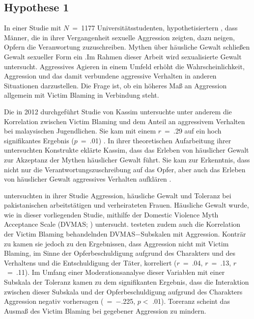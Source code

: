 \subsection{Hypothese 1}  \label{subsec_2.2.1}
In einer Studie mit $N$~=~1177 Universitätsstudenten, hypothetisiertern \textcite{H1_1993}, dass Männer, die in ihrer Vergangenheit sexuelle Aggression zeigten, dazu neigen, Opfern die Veranwortung zuzuschreiben. Mythen über häusliche Gewalt schließen Gewalt sexueller Form ein \parencite{H1_Poli_2022}.Im Rahmen dieser Arbeit wird sexualisierte Gewalt untersucht. Aggressives Agieren in einem Umfeld erhöht die Wahrscheinlichkeit, Aggression und das damit verbundene aggressive Verhalten in anderen Situationen darzustellen. Die Frage ist, ob ein höheres Maß an Aggression allgemein mit Victim Blaming in Verbindung steht.

Die in 2012 durchgeführt Studie von Kassim untersuchte unter anderem die Korrelation zwischen Victim Blaming und dem Anteil an aggressivem Verhalten bei malaysischen Jugendlichen. Sie kam mit einem $r$~=~.29 auf ein hoch signifikantes Ergebnis ($p$~=~.01) \parencite{H1_malasia_2012}. In ihrer theoretischen Aufarbeitung ihrer untersuchten Konstrukte eklärte Kassim, dass das Erleben von häuslicher Gewalt zur Akzeptanz der Mythen häuslicher Gewalt führt. Sie kam zur Erkenntnis, dass nicht nur die Verantwortungszuschreibung auf das Opfer, aber auch das Erleben von häuslicher Gewalt aggressives Verhalten aufklären \parencite{H1_malasia_2012}.

\textcite{H1_moderation_2020} untersuchten in ihrer Studie Aggression, häusliche Gewalt und Toleranz bei pakistanischen arbeitstätigen und verheirateten Frauen. Häusliche Gewalt wurde, wie in dieser vorliegenden Studie, mithilfe der Domestic Violence Myth Acceptance Scale (DVMAS; \textcite{Peters2003}) untersucht. \textcite{H1_moderation_2020} testeten zudem auch die Korrelation der Victim Blaming behandelnden DVMAS$-$Subskalen mit Aggression. Konträr zu \textcite{H1_malasia_2012} kamen sie jedoch zu den Ergebnissen, dass Aggression nicht mit Victim Blaming, im Sinne der Opferbeschuldigung aufgrund des Charakters und des Verhaltens und die Entschuldigung der Täter, korreliert ($r$~=~.04, $r$~=~.13, $r$~=~.11). Im Umfang einer Moderationsanalyse dieser Variablen mit einer Subskala der Toleranz kamen \textcite{H1_moderation_2020} zu dem signifikanten Ergebnis, dass die Interaktion zwischen dieser Subskala und der Opferbeschuldigung aufgrund des Charakters Aggression negativ vorhersagen (\textbeta~=~$-$.225, $p<$ .01). Toreranz scheint das Ausmaß des Victim Blaming bei gegebener Aggression zu mindern.

